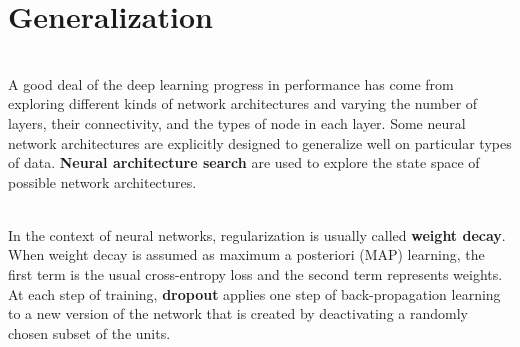 \documentclass{article}
\begin{document}
\section{Generalization}
\begin{paragraph}
\\
A good deal of the deep learning progress in performance has come from exploring different kinds of network architectures and varying the number of layers, their connectivity, and the types of node in each layer. Some neural network architectures are explicitly designed to generalize well on particular
types of data. \textbf{Neural architecture search} are used  to explore the state space of possible network architectures.
\end{paragraph}
\begin{paragraph}
\\
In the context of neural networks, regularization is usually called \textbf{weight decay}. When weight decay is assumed as maximum a posteriori (MAP) learning, the first term is the usual cross-entropy loss and the second term represents weights. At each step of training, \textbf{dropout} applies one step of back-propagation learning to a new version of the network that is created by deactivating a randomly chosen subset of the units.

\end{paragraph}
\end{document}

